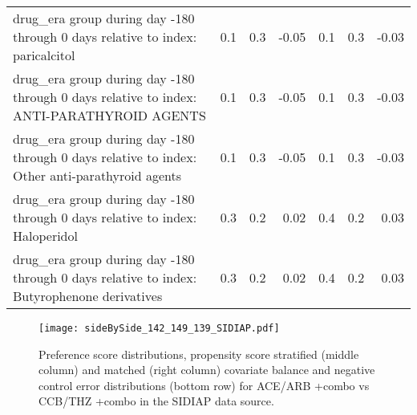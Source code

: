 \documentclass[11pt,]{article}
\begin{document}
\begin{longtable}{p{30em}rrrrrr}
  drug\_era group during day -180 through 0 days relative to index: paricalcitol & 0.1 & 0.3 & -0.05 & 0.1 & 0.3 & -0.03 \\ 
  drug\_era group during day -180 through 0 days relative to index: ANTI-PARATHYROID AGENTS & 0.1 & 0.3 & -0.05 & 0.1 & 0.3 & -0.03 \\ 
  drug\_era group during day -180 through 0 days relative to index: Other anti-parathyroid agents & 0.1 & 0.3 & -0.05 & 0.1 & 0.3 & -0.03 \\ 
  drug\_era group during day -180 through 0 days relative to index: Haloperidol & 0.3 & 0.2 & 0.02 & 0.4 & 0.2 & 0.03 \\ 
  drug\_era group during day -180 through 0 days relative to index: Butyrophenone derivatives & 0.3 & 0.2 & 0.02 & 0.4 & 0.2 & 0.03 \\ 
  \bottomrule
\end{longtable}
\clearpage\begin{figure}[H]
    \caption{Preference score distributions,
    propensity score stratified (middle column) and matched (right column) covariate balance
    and negative control error distributions (bottom row) for
    ACE/ARB +combo vs CCB/THZ +combo in the SIDIAP data source.}
    \centerline{
        \texttt{[image: sideBySide\_142\_149\_139\_SIDIAP.pdf]}
    }
\end{figure}
\end{document}
